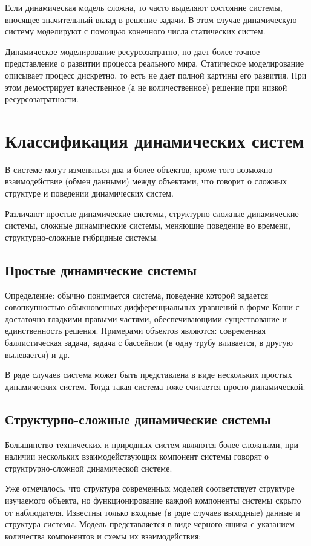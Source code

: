 \documentclass[12pt]{article}
\begin{document}
Если динамическая модель сложна, то часто выделяют состояние системы, вносящее значительный вклад в решение задачи. В этом случае динамическую систему моделируют с помощью конечного числа статических систем.

Динамическое моделирование ресурсозатратно, но дает более точное представление о развитии процесса реального мира. Статическое моделирование описывает процесс дискретно, то есть не дает полной картины его развития. При этом демострирует качественное (а не количественное) решение при низкой ресурсозатратности.

\newpage
\section{Классификация динамических систем}
В системе могут изменяться два и более объектов, кроме того возможно взаимодействие (обмен данными) между объектами, что говорит о сложных структуре и поведении динамических систем. 

Различают простые динамические системы, структурно-сложные динамические системы, сложные динамические системы, меняющие поведение во времени, структурно-сложные гибридные системы.

\subsection{Простые динамические системы}
Определение: обычно понимается система, поведение которой задается совопкупностью обыкновенных дифференциальных уравнений в форме Коши с достаточно гладкими правыми частями, обеспечивающими существование и единственность решения. Примерами объектов являются: современная баллистическая задача, задача с бассейном (в одну трубу вливается, в другую вылевается) и др.

В ряде случаев система может быть представлена в виде нескольких простых динамических систем. Тогда такая система тоже считается просто динамической. 

\subsection{Структурно-сложные динамические системы}
Большинство технических и природных систем являются более сложными, при наличии нескольких взаимодействующих компонент системы говорят о структрурно-сложной динамической системе.

Уже отмечалось, что структура современных моделей соответствует структуре изучаемого объекта, но функционирование каждой компоненты системы скрыто от наблюдателя. Известны только входные (в ряде случаев выходные) данные и структура системы. Модель представляется в виде черного ящика с указанием количества компонентов и схемы их взаимодействия:
\end{document}
